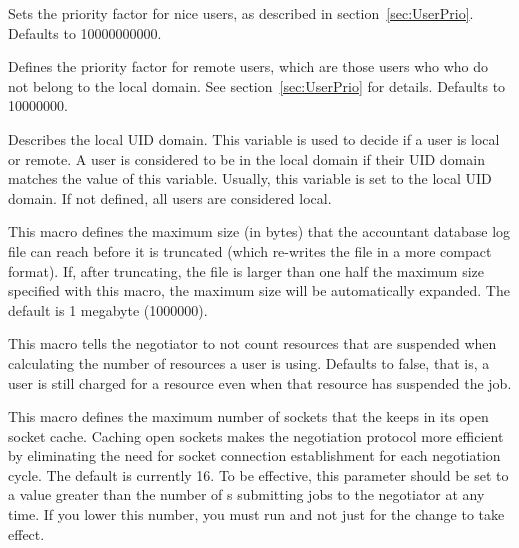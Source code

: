 \begin{description}
\label{param:NiceUserPrioFactor} 
\item[\Macro{NICE\_USER\_PRIO\_FACTOR}]
  Sets the priority factor for nice users, as described in
  section~\ref{sec:UserPrio}.
  Defaults to 10000000000.

\label{param:RemotePrioFactor} 
\item[\Macro{REMOTE\_PRIO\_FACTOR}]
  Defines the priority factor for remote users,
  which are those users who who do not belong to the local domain.
  See section~\ref{sec:UserPrio} for details.  
  Defaults to 10000000.

\label{param:AccountantLocalDomain} 
\item[\Macro{ACCOUNTANT\_LOCAL\_DOMAIN}]
  Describes the local UID domain.
  This variable is used to decide if a user is local or remote. 
  A user is considered to be in the local domain if their UID domain matches
  the value of this variable. Usually, this variable is set
  to the local UID domain. 
  If not defined, all users are considered local.

\label{param:MaxAccountantDatabaseSize}
\item[\Macro{MAX\_ACCOUNTANT\_DATABASE\_SIZE}] 
  This macro defines the maximum size (in bytes) that the accountant
  database log file can reach before it is truncated (which re-writes
  the file in a more compact format).
  If, after truncating, the file is larger than one half the maximum
  size specified with this macro, the maximum size will be
  automatically expanded.
  The default is 1 megabyte (1000000).

\label{param:NegotiatorDiscountSuspendedResources} 
\item[\Macro{NEGOTIATOR\_DISCOUNT\_SUSPENDED\_RESOURCES}]
   This macro tells the negotiator to not count resources that are suspended
   when calculating the number of resources a user is using. 
   Defaults to false, that is, a user is still charged for a resource even
   when that resource has suspended the job.

\label{param:NegotiatorSocketCacheSize}
\item[\Macro{NEGOTIATOR\_SOCKET\_CACHE\_SIZE}]
  This macro defines the maximum number of sockets that the 
  keeps in its open socket cache.
  Caching open sockets makes the negotiation
  protocol more efficient by eliminating the need for socket
  connection establishment for each negotiation cycle.  The default is
  currently 16.  To be effective, this parameter should be set to a
  value greater than the number of s submitting jobs to the
  negotiator at any time.  If you lower this number, you must run
   and not just  for the change to
  take effect.


\end{description}
